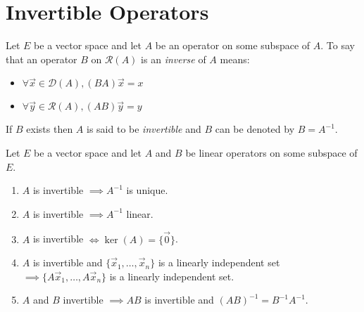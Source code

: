 \documentclass[letterpaper,12pt,fleqn]{article}
\newcommand{\md}{\mathcal{D}}
\newcommand{\mr}{\mathcal{R}}
\newcommand{\vx}{\vec{x}}
\newcommand{\vy}{\vec{y}}
\newcommand{\vo}{\vec{0}}
\begin{document}
\section*{Invertible Operators}

\begin{definition}[Inverse]
  Let $E$ be a vector space and let $A$ be an operator on some subspace of
  $A$. To say that an operator $B$ on $\mr(A)$ is an \emph{inverse} of $A$
  means:
  \begin{itemize}
  \item $\forall\vx\in\md(A), (BA)\vx=x$
  \item $\forall\vy\in\mr(A), (AB)\vy=y$
  \end{itemize}
  If $B$ exists then $A$ is said to be \emph{invertible} and $B$ can be
  denoted by $B=A^{-1}$.
\end{definition}

\begin{properties}
  Let $E$ be a vector space and let $A$ and $B$ be linear operators on some
  subspace of $E$.
  \begin{enumerate}
  \item $A$ is invertible $\implies A^{-1}$ is unique.
  \item $A$ is invertible $\implies A^{-1}$ linear.
  \item $A$ is invertible $\iff\ker(A)=\{\vo\}$.
  \item $A$ is invertible and $\{\vx_1,\ldots,\vx_n\}$ is a linearly
    independent set $\implies\{A\vx_1,\ldots,A\vx_n\}$ is a linearly
    independent set.
  \item $A$ and $B$ invertible $\implies AB$ is invertible and
    $(AB)^{-1}=B^{-1}A^{-1}$.
  \end{enumerate}
\end{properties}
\end{document}

